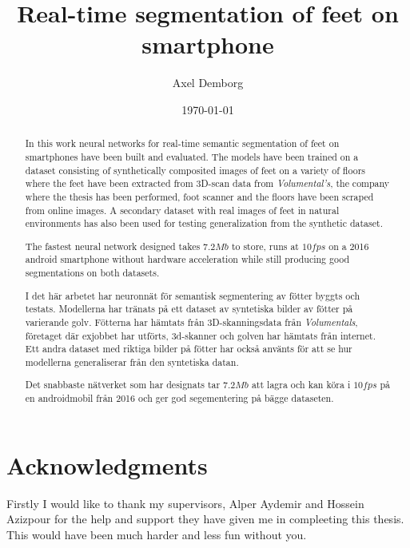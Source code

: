 \documentclass{kththesis}
\title{Real-time segmentation of feet on smartphone}
\author{Axel Demborg}
\date{\today}
\begin{document}
\listoftodos

\frontmatter

\titlepage

\begin{abstract}
  In this work neural networks for real-time semantic segmentation of feet on
  smartphones have been built and evaluated. The models have been trained on a
  dataset consisting of synthetically composited images of feet on a variety of
  floors where the feet have been extracted from 3D-scan data from
  \textit{Volumental's}, the company where the thesis has been performed, foot
  scanner and the floors have been scraped from online images. A secondary
  dataset with real images of feet in natural environments has also been used
  for testing generalization from the synthetic dataset.

  The fastest neural network designed takes \(7.2Mb\) to store, runs at
  \(10fps\) on a 2016 android smartphone without hardware acceleration while
  still producing good segmentations on both datasets.

\end{abstract}


\begin{otherlanguage}{swedish}
  \begin{abstract}
    I det här arbetet har neuronnät för semantisk segmentering av fötter
    byggts och testats. Modellerna har tränats på ett dataset av syntetiska
    bilder av fötter på varierande golv. Fötterna har hämtats från
    3D-skanningsdata från \textit{Volumentals}, företaget där exjobbet har
    utförts, 3d-skanner och golven har hämtats från internet. Ett andra dataset
    med riktiga bilder på fötter har också använts för att se hur modellerna
    generaliserar från den syntetiska datan.

    Det snabbaste nätverket som har designats tar \(7.2 Mb\) att lagra och kan
    köra i \(10fps\) på en androidmobil från 2016 och ger god segementering på
    bägge dataseten.
  \end{abstract}
\end{otherlanguage}

\section*{Acknowledgments}
Firstly I would like to thank my supervisors, Alper Aydemir and Hossein Azizpour for
the help and support they have given me in compleeting this thesis. This would
have been much harder and less fun without you.
\end{document}
